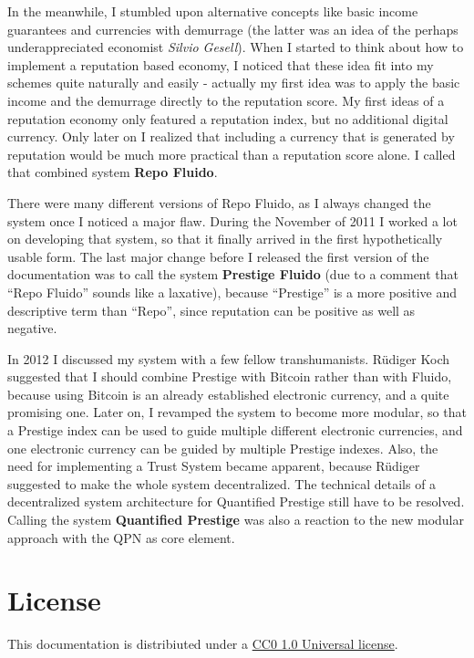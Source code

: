 \documentclass[a4paper,12pt]{scrartcl}
\newcounter{comment}
\begin{document}
In the meanwhile, I stumbled upon alternative concepts like basic income guarantees and currencies with demurrage (the latter was an idea of the perhaps underappreciated economist \textit{Silvio Gesell}). When I started to think about how to implement a reputation based economy, I noticed that these idea fit into my schemes quite naturally and easily - actually my first idea was to apply the basic income and the demurrage directly to the reputation score. My first ideas of a reputation economy only featured a reputation index, but no additional digital currency. Only later on I realized that including a currency that is generated by reputation would be much more practical than a reputation score alone. I called that combined system \textbf{Repo Fluido}.

There were many different versions of Repo Fluido, as I always changed the system once I noticed a major flaw. During the November of 2011 I worked a lot on developing that system, so that it finally arrived in the first hypothetically usable form. The last major change before I released the first version of the documentation was to call the system \textbf{Prestige Fluido} (due to a comment that “Repo Fluido” sounds like a laxative), because “Prestige” is a more positive and descriptive term than “Repo”, since reputation can be positive as well as negative.

In 2012 I discussed my system with a few fellow transhumanists. Rüdiger Koch suggested that I should combine Prestige with Bitcoin rather than with Fluido, because using Bitcoin is an already established electronic currency, and a quite promising one. Later on, I revamped the system to become more modular, so that a Prestige index can be used to guide multiple different electronic currencies, and one electronic currency can be guided by multiple Prestige indexes. Also, the need for implementing a Trust System became apparent, because Rüdiger suggested to make the whole system decentralized. The technical details of a decentralized system architecture for Quantified Prestige still have to be resolved. Calling the system \textbf{Quantified Prestige} was also a reaction to the new modular approach with the QPN as core element.

\section{License}
This documentation is distribiuted under a \href{http://creativecommons.org/publicdomain/zero/1.0/}{CC0 1.0 Universal license}. 
\end{document}
